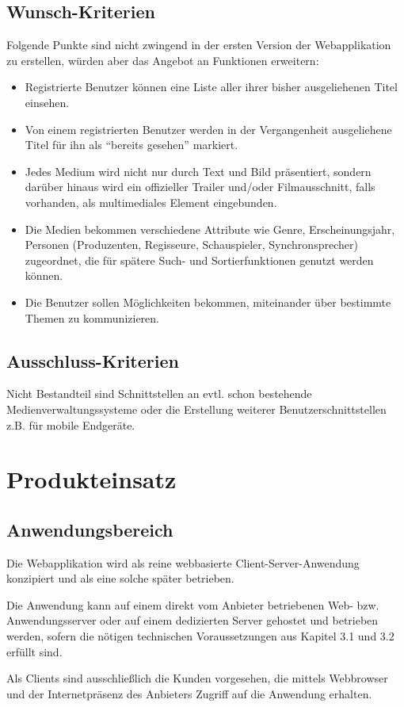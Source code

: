 \documentclass[12pt,oneside,a4paper,bibtotoc,liststotoc,pointlessnumbers]{scrartcl}
\begin{document}
\subsection{Wunsch-Kriterien}
Folgende Punkte sind nicht zwingend in der ersten Version der Webapplikation zu erstellen, würden aber das Angebot an Funktionen erweitern:
\begin{itemize}
\item Registrierte Benutzer können eine Liste aller ihrer bisher ausgeliehenen Titel einsehen.
\item Von einem registrierten Benutzer werden in der Vergangenheit ausgeliehene Titel für ihn als \enquote{bereits gesehen} markiert.
\item Jedes Medium wird nicht nur durch Text und Bild präsentiert, sondern darüber hinaus wird ein offizieller Trailer und/oder Filmausschnitt, falls vorhanden, als multimediales Element eingebunden.
\item Die Medien bekommen verschiedene Attribute wie Genre, Erscheinungsjahr, Personen (Produzenten, Regisseure, Schauspieler, Synchronsprecher) zugeordnet, die für spätere Such- und Sortierfunktionen genutzt werden können.
\item Die Benutzer sollen Möglichkeiten bekommen, miteinander über bestimmte Themen zu kommunizieren.
\end{itemize}
\subsection{Ausschluss-Kriterien}
Nicht Bestandteil sind Schnittstellen an evtl. schon bestehende Medienverwaltungssysteme oder die Erstellung weiterer Benutzerschnittstellen z.B. für mobile Endgeräte.
\newpage
\section{Produkteinsatz}
\subsection{Anwendungsbereich}
Die Webapplikation wird als reine webbasierte Client-Server-Anwendung konzipiert und als eine solche später betrieben.\par
Die Anwendung kann auf einem direkt vom Anbieter betriebenen Web- bzw. Anwendungsserver oder auf einem dedizierten Server gehostet und betrieben werden, sofern die nötigen technischen Voraussetzungen aus Kapitel 3.1 und 3.2 erfüllt sind.\par
Als Clients sind ausschließlich die Kunden vorgesehen, die mittels Webbrowser und der Internetpräsenz des Anbieters Zugriff auf die Anwendung erhalten. 
\end{document}
